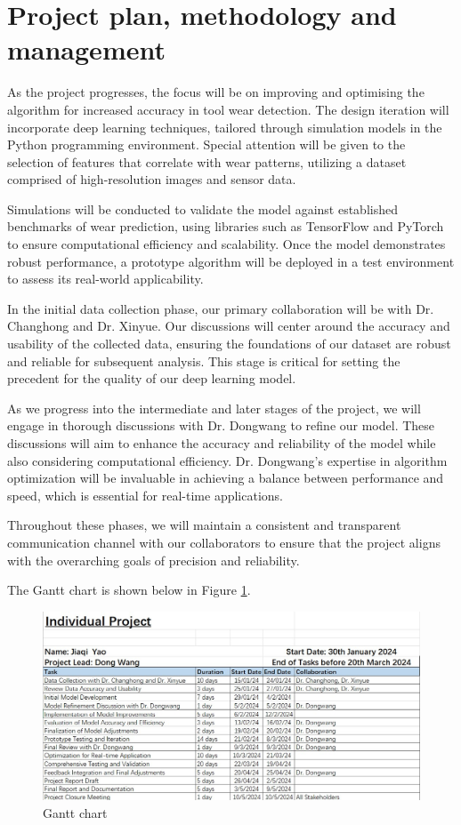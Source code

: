 \section{Project plan, methodology and management}
\label{sec:results}

As the project progresses, the focus will be on improving and optimising the algorithm for increased accuracy in tool wear detection. The design iteration will incorporate deep learning techniques, tailored through simulation models in the Python programming environment. Special attention will be given to the selection of features that correlate with wear patterns, utilizing a dataset comprised of high-resolution images and sensor data.

Simulations will be conducted to validate the model against established benchmarks of wear prediction, using libraries such as TensorFlow and PyTorch to ensure computational efficiency and scalability. Once the model demonstrates robust performance, a prototype algorithm will be deployed in a test environment to assess its real-world applicability.

In the initial data collection phase, our primary collaboration will be with Dr. Changhong and Dr. Xinyue. Our discussions will center around the accuracy and usability of the collected data, ensuring the foundations of our dataset are robust and reliable for subsequent analysis. This stage is critical for setting the precedent for the quality of our deep learning model.

As we progress into the intermediate and later stages of the project, we will engage in thorough discussions with Dr. Dongwang to refine our model. These discussions will aim to enhance the accuracy and reliability of the model while also considering computational efficiency. Dr. Dongwang’s expertise in algorithm optimization will be invaluable in achieving a balance between performance and speed, which is essential for real-time applications.

Throughout these phases, we will maintain a consistent and transparent communication channel with our collaborators to ensure that the project aligns with the overarching goals of precision and reliability.

The Gantt chart is shown below in Figure \ref{fig:gantt}.

\begin{figure}[htbp]
    \centering
    \includegraphics[width=\textwidth]{gantt.jpg}
    \caption{Gantt chart}
    \label{fig:gantt}
\end{figure}
\FloatBarrier %
